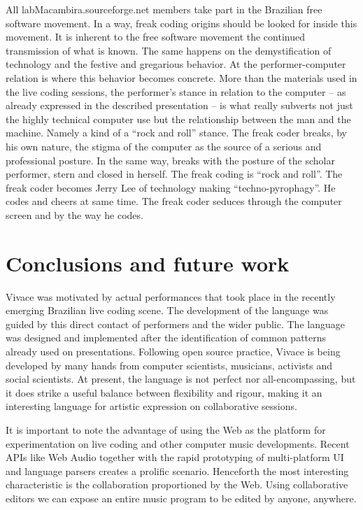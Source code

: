 \documentclass[letterpaper, 12pt]{article}
\begin{document}
All labMacambira.sourceforge.net members take part in the Brazilian
free software movement. In a way, freak coding origins should be
looked for inside this movement. It is inherent to the free software
movement the continued transmission of what is known. The same happens
on the demystification of technology and the festive and gregarious
behavior. At the performer-computer relation is where this behavior
becomes concrete. More than the materials used in the live coding
sessions, the performer's stance in relation to the computer -- as
already expressed in the described presentation -- is what really
subverts not just the highly technical computer use but the
relationship between the man and the machine. Namely a kind of a
``rock and roll'' stance. The freak coder breaks, by his own nature,
the stigma of the computer as the source of a serious and professional
posture. In the same way, breaks with the posture of the scholar
performer, stern and closed in herself. The freak coding is ``rock and
roll''. The freak coder becomes Jerry Lee of technology making
``techno-pyrophagy''. He codes and cheers at same time. The freak
coder seduces through the computer screen and by the way he codes.

\section{Conclusions and future work}

Vivace was motivated by actual performances that took place in the
recently emerging Brazilian live coding scene. The development of the
language was guided by this direct contact of performers and the wider
public. The language was designed and implemented after the
identification of common patterns already used on
presentations. Following open source practice, Vivace is being
developed by many hands from computer scientists, musicians, activists
and social scientists. At present, the language is not perfect nor
all-encompassing, but it does strike a useful balance between
flexibility and rigour, making it an interesting language for artistic
expression on collaborative sessions.

It is important to note the advantage of using the Web as the platform
for experimentation on live coding and other computer music
developments. Recent APIs like Web Audio together with the rapid
prototyping of multi-platform UI and language parsers creates a
prolific scenario. Henceforth the most interesting characteristic is
the collaboration proportioned by the Web. Using collaborative editors
we can expose an entire music program to be edited by anyone,
anywhere.
\end{document}
